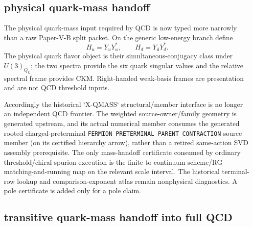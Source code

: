 \documentclass[12pt,a4paper]{article}
\begin{document}
\subsection{physical quark-mass handoff}
\label{px:sec:post-v125-qmass}

The physical quark-mass input required by QCD is now typed more narrowly than
a raw Paper-V-B split packet.  On the generic low-energy branch define
\[
 H_u=Y_uY_u^*,\qquad H_d=Y_dY_d^*.
\]
The physical quark flavor object is their simultaneous-conjugacy class under
$U(3)_{Q_L}$; the two spectra provide the six quark singular values and the
relative spectral frame provides CKM.  Right-handed weak-basis frames are
presentation and are not QCD threshold inputs.

Accordingly the historical `X-QMASS` structural/member interface is no longer
an independent QCD frontier.  The weighted source-owner/family geometry is
generated upstream, and its actual numerical member consumes the generated rooted charged-preterminal
\texttt{FERMION\_PRETERMINAL\_PARENT\_CONTRACTION} source member (on its certified hierarchy arrow), rather than a retired same-action SVD assembly prerequisite.  The only mass-handoff
certificate consumed by ordinary threshold/chiral-spurion execution is the
finite-to-continuum scheme/RG matching-and-running map on the relevant scale
interval.  The historical terminal-row lookup and comparison-exponent atlas
remain nonphysical diagnostics.  A pole certificate is added only for a pole
claim.




\subsection{transitive quark-mass handoff into full QCD}
\label{p10:sec:v164-transitive-qmass-handoff}
\end{document}
